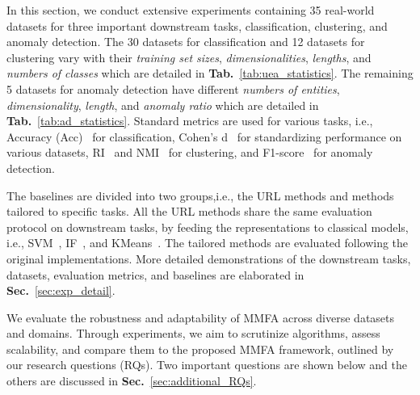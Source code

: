 \documentclass{article}
\begin{document}
In this section, we conduct extensive experiments containing 35 real-world datasets for three important downstream tasks, classification, clustering, and anomaly detection. The 30 datasets for classification and 12 datasets for clustering vary with their \textit{training set sizes}, \textit{dimensionalities}, \textit{lengths}, and \textit{numbers of classes} which are detailed in \textbf{Tab.}~\ref{tab:uea_statistics}. The remaining 5 datasets for anomaly detection have different \textit{numbers of entities}, \textit{dimensionality}, \textit{length}, and \textit{anomaly ratio} which are detailed in \textbf{Tab.}~\ref{tab:ad_statistics}. Standard metrics are used for various tasks, i.e., Accuracy (Acc)~\cite{bagnall2018uea} for classification, Cohen's d~\cite{becker2000effect} for standardizing performance on various datasets, RI~\cite{Hubert1985ComparingP} and NMI~\cite{Strehl2002ClusterE} for clustering, and F1-score~\cite{li2021multivariate} for anomaly detection.

The baselines are divided into two groups,i.e., the URL methods and methods tailored to specific tasks. All the URL methods share the same evaluation protocol on downstream tasks, by feeding the representations to classical models, i.e., SVM~\cite{Cortes1995SupportVectorN}, IF~\cite{Liu2008IsolationF}, and KMeans~\cite{MacQueen1967SomeMF}. The tailored methods are evaluated following the original implementations. More detailed demonstrations of the downstream tasks, datasets, evaluation metrics, and baselines are elaborated in \textbf{Sec.}~\ref{sec:exp_detail}.





We evaluate the robustness and adaptability of MMFA across diverse datasets and domains. Through experiments, we aim to scrutinize algorithms, assess scalability, and compare them to the proposed MMFA framework, outlined by our research questions (RQs). Two important questions are shown below and the others are discussed in \textbf{Sec.}~\ref{sec:additional_RQs}.
\end{document}
